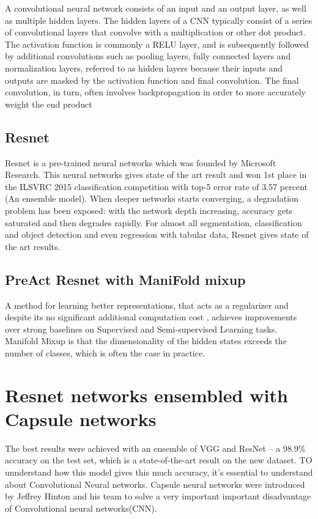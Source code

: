 \documentclass[12pt]{report}
\begin{document}
A convolutional neural network consists of an input and an output
layer, as well as multiple hidden layers. The hidden layers of a CNN
typically consist of a series of convolutional layers that convolve
with a multiplication or other dot product. The activation function is
commonly a RELU layer, and is subsequently followed by additional
convolutions such as pooling layers, fully connected layers and
normalization layers, referred to as hidden layers because their
inputs and outputs are masked by the activation function and final
convolution. The final convolution, in turn, often involves
backpropagation in order to more accurately weight the end product

\subsection{Resnet}
Resnet is a pre-trained neural networks which was founded by Microsoft Research.
This neural networks gives state of the art result and won 1st place
in the ILSVRC 2015 classification competition with top-5 error rate of
3.57 percent
(An ensemble model). When deeper networks starts converging, a
degradation problem has been exposed: with the network depth
increasing, accuracy gets saturated and then degrades rapidly. For
almost all segmentation, classification and object
detection  and even regression with tabular data, Resnet gives state of the
art results.

\subsection{PreAct Resnet with ManiFold mixup}

A method for learning better representations, that acts as a
regularizer and despite its no significant additional computation cost
, achieves improvements over strong baselines on Supervised and
Semi-supervised Learning tasks.
 Manifold Mixup is that the dimensionality of the hidden states
exceeds the number of classes, which is often the case in practice.

\section{Resnet networks ensembled with Capsule networks}

The best results were achieved with an ensemble of VGG and ResNet – a
98.9\% accuracy on the test set, which is a state-of-the-art result on
the new dataset. TO unnderstand how this model gives this much
accuracy, it’s essential to understand about Convolutional Neural
networks. Capsule neural networks were introduced by Jeffrey Hinton
and his team to solve a very important important disadvantage of
Convolutional neural networks(CNN).
\end{document}
